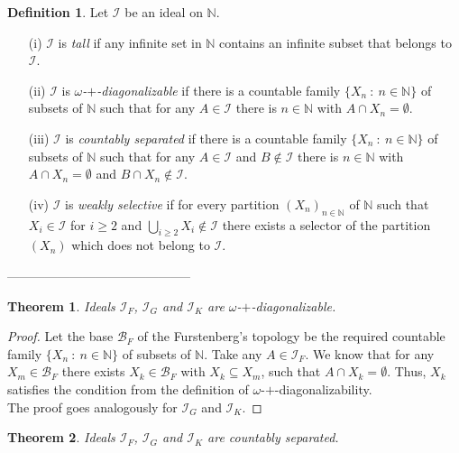 \documentclass{amsart}
\newtheorem{thm}{Theorem}
\theoremstyle{definition}
\newtheorem{df}{Definition}
\theoremstyle{definition}
\newcommand{\N}{{\mathbb N}}
\newcommand{\I}{\mathcal I}
\begin{document}
\begin{df} Let $\mathcal{I}$ be an ideal on $\N$.
\begin{enumerate}
\item[(i)] $\mathcal{I}$ is \emph{tall} if any infinite set in $\N$ contains an infinite subset that belongs to $\mathcal{I}$. 
\item[(ii)] $\mathcal{I}$ is \emph{$\omega$-$+$-diagonalizable} if there is a countable family $\{X_n\ :\ n\in\N\}$ of subsets of $\N$ such that for any $A\in \mathcal{I}$ there is $n\in\N$ with $A\cap X_n=\emptyset$.
\item[(iii)] $\mathcal{I}$ is \emph{countably separated} if there is a countable family $\{X_n\ :\ n\in\N\}$ of subsets of $\N$ such that for any $A\in \mathcal{I}$ and $B\notin \mathcal{I}$ there is $n\in\N$ with $A\cap X_n=\emptyset$ and $B\cap X_n\notin \mathcal{I}$. %
\item[(iv)] $\mathcal{I}$ is \emph{weakly selective} if for every partition $(X_n)_{n\in\N}$ of $\N$ such that $X_i\in\I$ for $i\geq 2$ and $\bigcup_{i\geq 2} X_i \notin\I$ there exists a selector of the partition $(X_n)$ which does not belong to $\I$.
\end{enumerate}
\end{df}


--------------------------------------------

\begin{thm}
Ideals $\I_F$, $\I_G$ and $\I_K$ are $\omega$-$+$-diagonalizable.
\end{thm}

\begin{proof}
Let the base $\mathcal{B}_F$ of the Furstenberg's topology be the required countable family $\{X_n\ :\ n\in\N\}$ of subsets of $\N$. Take any $A\in \I_F$. We know that for any $X_m \in \mathcal{B}_F$ there exists $X_k \in \mathcal{B}_F$ with $X_k \subseteq X_m$, such that $A\cap X_k = \emptyset$. Thus, $X_k$ satisfies the condition from the definition of $\omega$-$+$-diagonalizability.\\
The proof goes analogously for $\I_G$ and $\I_K$.
\end{proof}


\begin{thm}
Ideals $\I_F$, $\I_G$ and $\I_K$ are countably separated.
\end{thm}
\end{document}
